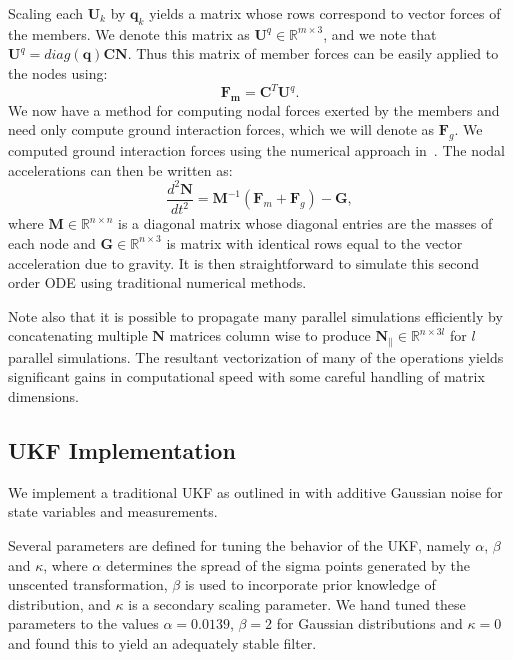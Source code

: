 {Scaling each $\boldsymbol{U}_k$ by $\boldsymbol{q}_k$ yields a matrix whose rows correspond to vector forces of the members. 
We denote this matrix as $\boldsymbol{U}^q\in\mathbb{R}^{m\times 3}$, and we note that $\boldsymbol{U}^q = diag(\boldsymbol{q}) \boldsymbol{C} \boldsymbol{N}$.
Thus this matrix of member forces can be easily applied to the nodes using:
$$
\boldsymbol{F_m} = \boldsymbol{C}^{T} \boldsymbol{U}^q.
$$
We now have a method for computing nodal forces exerted by the members and need only compute ground interaction forces, which we will denote as $\boldsymbol{F}_g$.
We computed ground interaction forces using the numerical approach in~\cite{yamane2006stable}. The nodal accelerations can then be written as:
$$
\frac{d^2\boldsymbol{N}}{dt^2} = \boldsymbol{M}^{-1}(\boldsymbol{F}_m+ \boldsymbol{F}_g) -  \boldsymbol{G},
$$
where $\boldsymbol{M}\in\mathbb{R}^{n\times n}$ is a diagonal matrix whose diagonal entries are the masses of each node and $\boldsymbol{G}\in\mathbb{R}^{n\times 3}$ is matrix with identical rows equal to the vector acceleration due to gravity. 
It is then straightforward to simulate this second order ODE using traditional numerical methods. 

Note also that it is possible to propagate many parallel simulations efficiently by concatenating multiple $\boldsymbol{N}$ matrices column wise to produce  $\boldsymbol{N}_{\parallel}\in\mathbb{R}^{n\times 3l}$ for $l$ parallel simulations.
The resultant vectorization of many of the operations yields significant gains in computational speed with some careful handling of matrix dimensions.   

\subsection{UKF Implementation}

We implement a traditional UKF as outlined in \cite{wan2000unscented} with additive Gaussian noise for state variables and measurements.

Several parameters are defined for tuning the behavior of the UKF, namely $\alpha$, $\beta$ and $\kappa$, where $\alpha$ determines the spread of the sigma points generated by the unscented transformation, $\beta$ is used to incorporate prior knowledge of distribution, and $\kappa$ is a secondary scaling parameter.
We hand tuned these parameters to the values $\alpha = 0.0139$, $\beta = 2$ for Gaussian distributions and $\kappa = 0$ and found this to yield an adequately stable filter.

}
